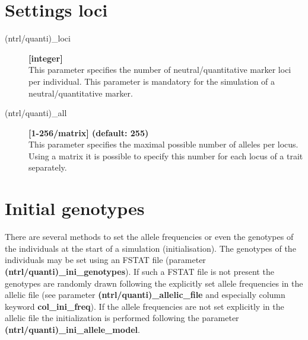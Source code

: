 \documentclass[letterpaper,12pt,oneside]{book}
\begin{document}
\section{Settings loci}
\begin{description}
\item[(ntrl/quanti)\_loci] \textbf{[integer]}\\
This parameter specifies the number of neutral/quantitative marker loci per individual. This parameter is mandatory for the simulation of a neutral/quantitative marker.

\item[(ntrl/quanti)\_all] \textbf{[1-256/matrix] (default: 255)}\\
This parameter specifies the maximal possible number of alleles per locus. Using a matrix it is possible to specify this number for each locus of a trait separately.
\end{description}
\section{Initial genotypes}\label{iniGenoQuanti}
There are several methods to set the allele frequencies or even the genotypes of the individuals at the start of a simulation (initialisation). The genotypes of the individuals may be set using an FSTAT file \citep{Goudet_1995} (parameter \textbf{(ntrl/quanti)\_ini\_genotypes}). If such a FSTAT file is not present the genotypes are randomly drawn following the explicitly set allele frequencies in the allelic file (see parameter \textbf{(ntrl/quanti)\_allelic\_file} and especially column keyword \textbf{col\_ini\_freq}). If the allele frequencies are not set explicitly in the allelic file the initialization is performed following the parameter \textbf{(ntrl/quanti)\_ini\_allele\_model}.  
\end{document}
